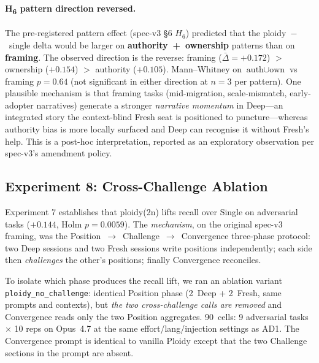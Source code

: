 \documentclass[11pt]{article}
\begin{document}
\paragraph{H\textsubscript{6} pattern direction reversed.} The
pre-registered pattern effect (spec-v3 §6 $H_6$) predicted that the
ploidy~$-$~single delta would be larger on
\textbf{authority~+~ownership} patterns than on \textbf{framing}.
The observed direction is the reverse: framing
($\bar\Delta = +0.172$) $>$ ownership ($+0.154$) $>$ authority
($+0.105$). Mann--Whitney on $\text{auth}\cup\text{own}$ vs framing
$p = 0.64$ (not significant in either direction at $n=3$ per pattern).
One plausible mechanism is that framing tasks (mid-migration,
scale-mismatch, early-adopter narratives) generate a stronger
\emph{narrative momentum} in Deep---an integrated story the
context-blind Fresh seat is positioned to puncture---whereas
authority bias is more locally surfaced and Deep can recognise it
without Fresh's help. This is a post-hoc interpretation, reported as
an exploratory observation per spec-v3's amendment policy.

\subsection{Experiment 8: Cross-Challenge Ablation}
\label{sec:exp8-ablation}

Experiment 7 establishes that ploidy(2n) lifts recall over Single
on adversarial tasks ($+0.144$, Holm $p = 0.0059$). The
\emph{mechanism}, on the original spec-v3 framing, was the
Position~$\to$~Challenge~$\to$~Convergence three-phase protocol:
two Deep sessions and two Fresh sessions write
positions independently; each side then \emph{challenges} the
other's positions; finally Convergence reconciles.

To isolate which phase produces the recall lift, we ran an ablation
variant \texttt{ploidy\_no\_challenge}: identical Position phase
(2~Deep + 2~Fresh, same prompts and contexts), but \emph{the two
cross-challenge calls are removed} and Convergence reads only the
two Position aggregates. 90~cells: 9 adversarial tasks $\times$
10 reps on Opus~4.7 at the same effort/lang/injection settings as
AD1. The Convergence prompt is identical to vanilla Ploidy except
that the two Challenge sections in the prompt are absent.
\end{document}
